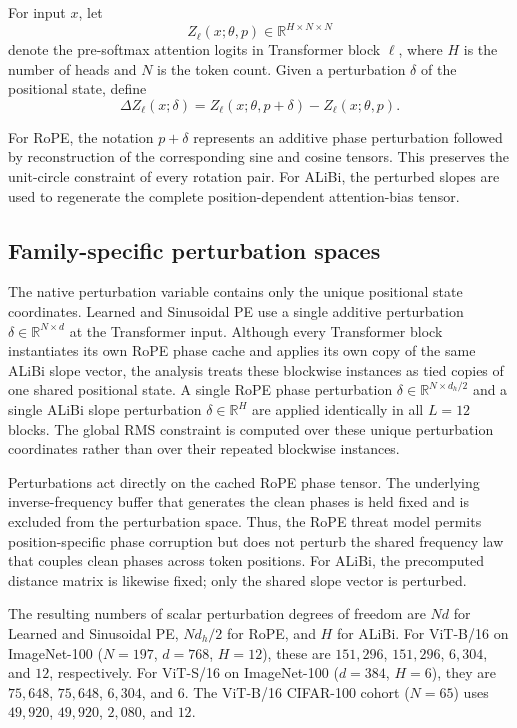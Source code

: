 \documentclass[preprint,12pt,authoryear]{elsarticle}
\begin{document}
For input $x$, let
\[
Z_{\ell}(x;\theta,p)
\in
\mathbb{R}^{H\times N\times N}
\]
denote the pre-softmax attention logits in Transformer block $\ell$,
where $H$ is the number of heads and $N$ is the token count. Given a
perturbation $\delta$ of the positional state, define
\[
\Delta Z_{\ell}(x;\delta)
=
Z_{\ell}(x;\theta,p+\delta)
-
Z_{\ell}(x;\theta,p).
\]

For RoPE, the notation $p+\delta$ represents an additive phase
perturbation followed by reconstruction of the corresponding sine and
cosine tensors. This preserves the unit-circle constraint of every
rotation pair. For ALiBi, the perturbed slopes are used to regenerate
the complete position-dependent attention-bias tensor.

\subsection{Family-specific perturbation spaces}

The native perturbation variable contains only the unique positional
state coordinates. Learned and Sinusoidal PE use a single additive
perturbation $\delta\in\mathbb{R}^{N\times d}$ at the Transformer input.
Although every Transformer block instantiates its own RoPE phase cache and
applies its own copy of the same ALiBi slope vector, the analysis treats
these blockwise instances as tied copies of one shared positional state.
A single RoPE phase perturbation
$\delta\in\mathbb{R}^{N\times d_h/2}$ and a single ALiBi slope
perturbation $\delta\in\mathbb{R}^{H}$ are applied identically in all
$L=12$ blocks. The global RMS constraint is computed over these unique
perturbation coordinates rather than over their repeated blockwise
instances.

Perturbations act directly on the cached RoPE phase tensor. The underlying
inverse-frequency buffer that generates the clean phases is held fixed and
is excluded from the perturbation space. Thus, the RoPE threat model
permits position-specific phase corruption but does not perturb the shared
frequency law that couples clean phases across token positions. For ALiBi,
the precomputed distance matrix is likewise fixed; only the shared slope
vector is perturbed.

The resulting numbers of scalar perturbation degrees of freedom are
$N d$ for Learned and Sinusoidal PE, $N d_h/2$ for RoPE, and $H$ for
ALiBi. For ViT-B/16 on ImageNet-100 ($N=197$, $d=768$, $H=12$), these
are $151{,}296$, $151{,}296$, $6{,}304$, and $12$, respectively. For
ViT-S/16 on ImageNet-100 ($d=384$, $H=6$), they are $75{,}648$,
$75{,}648$, $6{,}304$, and $6$. The ViT-B/16 CIFAR-100 cohort
($N=65$) uses $49{,}920$, $49{,}920$, $2{,}080$, and $12$.
\end{document}
